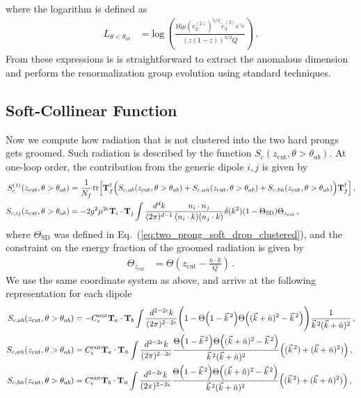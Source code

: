 \documentclass[a4paper,11pt]{article}
\newcommand{\nbar}{{\bar n}}
\newcommand{\ecf}[2]{e_{#1}^{(#2)}}
\newcommand{\ecflp}[2]{\tilde e_{#1}^{(#2)}}
\def\log{\text{log}}
\def\zcut{z_{\text{cut}}}
\def\nbar{\bar n}
\DeclareRobustCommand{\Eq}[1]{Eq.~(\ref{#1})}
\begin{document}
where the logarithm is defined as
{\small\begin{align}
L_{\theta<\theta_{ab}}&=\log\,\left(\frac{16\mu(\ecf{2}{2})^{5/2}\,\ecflp{3}{2}e^{\gamma_E}}{(z(1-z))^{3/2}Q}\right)\,.
\end{align}}
From these expressions is is straightforward to extract the anomalous dimension and perform the renormalization group evolution using standard techniques.

\subsection{Soft-Collinear Function}\label{sec:soft_drop_fails}
Now we compute how radiation that is not clustered into the two hard prongs gets groomed. Such radiation is described by the function $S_c(\zcut,\theta>\theta_{ab})$. At one-loop order, the contribution from the generic dipole $i,j$ is given by
{\small\begin{align}\label{eq:soft_drop_fails_soft_collinear_one_loop}
S^{(1)}_{c}(\zcut,\theta>\theta_{ab})&=\frac{1}{N_f}\text{tr}\Big[\mathbf{T}_f^{\dagger}\Big(S_{c, ab}(\zcut,\theta>\theta_{ab})+S_{c, a\nbar}(\zcut,\theta>\theta_{ab})+S_{c, b\nbar}(\zcut,\theta>\theta_{ab})\Big)\mathbf{T}_f^{\dagger}\Big]\,,\\
S_{c, ij}(\zcut,\theta>\theta_{ab}) &= -2g^2\mu^{2\epsilon}{\bf T}_i\cdot {\bf T}_j \int\frac{d^dk}{(2\pi)^{d-1}}\frac{n_i\cdot n_j}{(n_i\cdot k)(n_j\cdot k)}\delta(k^2) (1-\Theta_\text{SD})\Theta_{\zcut}\,,
\end{align}}
where $\Theta_\text{SD}$ was defined in \Eq{eq:two_prong_soft_drop_clustered}, and the constraint on the energy fraction of the groomed radiation is given by
\begin{align}\label{eq:soft_drop_fails}
\Theta_{\zcut}&=\Theta\left(\zcut-\frac{\nbar\cdot k}{Q}\right)\,.
\end{align}
We use the same coordinate system as above, and arrive at the following representation for each dipole
{\small\begin{align}
S_{c, ab}(\zcut,\theta>\theta_{ab}) &= -C_{\epsilon}^{\text{out}}{\bf T}_a\cdot {\bf T}_b\int\frac{d^{2-2\epsilon}{k}}{(2\pi)^{2-2\epsilon}}\Bigg(1-\Theta\Big(1-\vec{k}^{\,2}\Big)\Theta\Big((\vec{k}+\hat{n})^2-\vec{k}^{\,2}\Big)\Bigg)\frac{1}{\vec{k}^{\,2}(\vec{k}+\hat{n})^2}\,,\nonumber\\
S_{c, a\nbar}(\zcut,\theta>\theta_{ab}) &= C_{\epsilon}^{\text{out}}{\bf T}_a\cdot {\bf T}_{\nbar} \int\frac{d^{2-2\epsilon}{k}}{(2\pi)^{2-2\epsilon}}\frac{\Theta\Big(1-\vec{k}^{\,2}\Big)\Theta\Big((\vec{k}+\hat{n})^2-\vec{k}^{\,2}\Big)}{\vec{k}^{\,2}(\vec{k}+\hat{n})^2}\Big((\vec{k}^{\,2})+(\vec{k}+\hat{n})^2)\Big)\,,\nonumber\\
S_{c, b\nbar}(\zcut,\theta>\theta_{ab}) &= C_{\epsilon}^{\text{out}}{\bf T}_b\cdot {\bf T}_{\nbar} \int\frac{d^{2-2\epsilon}{k}}{(2\pi)^{2-2\epsilon}}\frac{\Theta\Big(1-\vec{k}^{\,2}\Big)\Theta\Big((\vec{k}+\hat{n})^2-\vec{k}^{\,2}\Big)}{\vec{k}^{\,2}(\vec{k}+\hat{n})^2}\Big((\vec{k}^{\,2})+(\vec{k}+\hat{n})^2)\Big)\,,
\end{align}}
\end{document}
